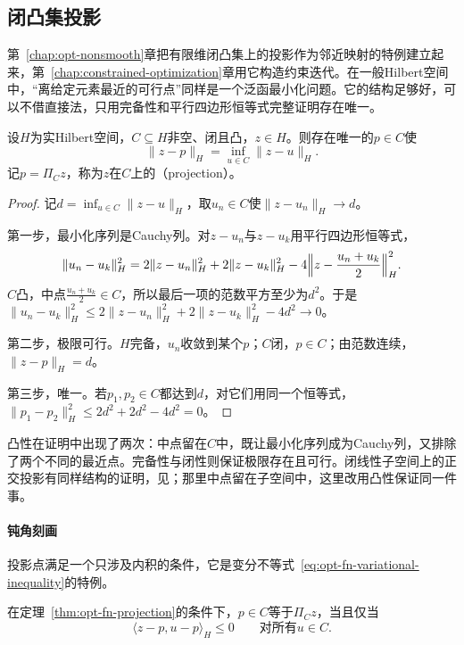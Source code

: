 \subsection{闭凸集投影}
\label{sec:opt-fn-projection}

第~\ref{chap:opt-nonsmooth}章把有限维闭凸集上的投影作为邻近映射的特例建立起来，第~\ref{chap:constrained-optimization}章用它构造约束迭代。在一般Hilbert空间中，“离给定元素最近的可行点”同样是一个泛函最小化问题。它的结构足够好，可以不借直接法，只用完备性和平行四边形恒等式完整证明存在唯一。

\begin{theorem}[闭凸集上的投影]
\label{thm:opt-fn-projection}
设$H$为实Hilbert空间，$C\subseteq H$非空、闭且凸，$z\in H$。则存在唯一的$p\in C$使
\[
 \|z-p\|_H=\inf_{u\in C}\|z-u\|_H .
\]
记$p=\Pi_Cz$，称为$z$在$C$上的（projection）。
\end{theorem}

\begin{proof}
记$d=\inf_{u\in C}\|z-u\|_H$，取$u_n\in C$使$\|z-u_n\|_H\to d$。

第一步，最小化序列是Cauchy列。对$z-u_n$与$z-u_k$用平行四边形恒等式，
\[
 \|u_n-u_k\|_H^2=2\|z-u_n\|_H^2+2\|z-u_k\|_H^2-4\Bigl\|z-\frac{u_n+u_k}2\Bigr\|_H^2 .
\]
$C$凸，中点$\frac{u_n+u_k}2\in C$，所以最后一项的范数平方至少为$d^2$。于是$\|u_n-u_k\|_H^2\le2\|z-u_n\|_H^2+2\|z-u_k\|_H^2-4d^2\to0$。

第二步，极限可行。$H$完备，$u_n$收敛到某个$p$；$C$闭，$p\in C$；由范数连续，$\|z-p\|_H=d$。

第三步，唯一。若$p_1,p_2\in C$都达到$d$，对它们用同一个恒等式，$\|p_1-p_2\|_H^2\le2d^2+2d^2-4d^2=0$。
\end{proof}

凸性在证明中出现了两次：中点留在$C$中，既让最小化序列成为Cauchy列，又排除了两个不同的最近点。完备性与闭性则保证极限存在且可行。闭线性子空间上的正交投影有同样结构的证明，见；那里中点留在子空间中，这里改用凸性保证同一件事。

\paragraph{钝角刻画}
投影点满足一个只涉及内积的条件，它是变分不等式~\eqref{eq:opt-fn-variational-inequality}的特例。

\begin{theorem}[投影的变分刻画]
\label{thm:opt-fn-projection-characterization}
在定理~\ref{thm:opt-fn-projection}的条件下，$p\in C$等于$\Pi_Cz$，当且仅当
\begin{equation}
 \langle z-p,u-p\rangle_H\le0\qquad\text{对所有}u\in C .
 \label{eq:opt-fn-projection-vi}
\end{equation}
\end{theorem}

